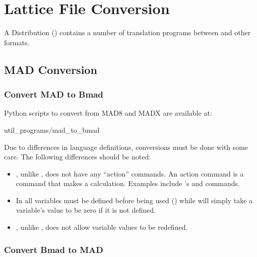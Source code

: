 \chapter{Lattice File Conversion}
\label{c:lat.convert}

A \bmad Distribution () contains a number of translation programs between \bmad
and other formats.


\section{MAD Conversion}
\label{s:mad.convert}

\subsection{Convert MAD to Bmad}
\label{s:mad.bmad.uap}

Python scripts to convert from MAD8 and MADX are available at:
\begin{example}
  util_programs/mad_to_bmad
\end{example}
Due to differences in language definitions, conversions must be done with some care. The following
differences should be noted:
  \begin{itemize}
  \item
\bmad, unlike \mad, does not have any ``action'' commands. An action command is a command that makes
a calculation. Examples include \mad's  and  commands.
  \item
In \bmad all variables must be defined before being used () while \mad will simply take
a variable's value to be zero if it is not defined.
  \item
\bmad, unlike \mad, does not allow variable values to be redefined.
  \end{itemize}

\subsection{Convert Bmad to MAD}
\label{s:bmad.mad}

